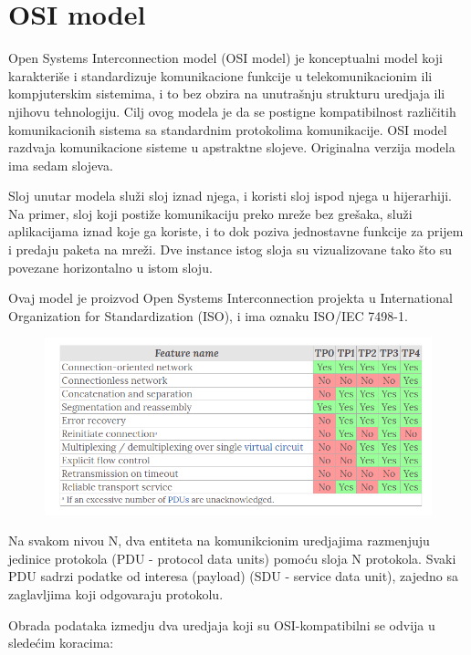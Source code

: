 \documentclass[a4paper,12pt, master]{etf}
\begin{document}
	\section{OSI model}

	Open Systems Interconnection model (OSI model) je konceptualni model koji
	karakteri\v{s}e i standardizuje komunikacione funkcije u telekomunikacionim
	ili kompjuterskim sistemima, i to bez obzira na unutra\v{s}nju strukturu
	uredjaja ili njihovu tehnologiju. Cilj ovog modela je da se postigne
	kompatibilnost razli\v{c}itih komunikacionih sistema sa standardnim
	protokolima komunikacije. OSI model razdvaja komunikacione sisteme u
	apstraktne slojeve.	Originalna verzija modela ima sedam slojeva.

	Sloj unutar modela slu\v{z}i sloj iznad njega, i koristi sloj ispod njega u
	hijerarhiji. Na	primer, sloj koji posti\v{z}e komunikaciju preko mre\v{z}e
	bez gre\v{s}aka, slu\v{z}i aplikacijama iznad koje ga koriste, i to dok
	poziva jednostavne funkcije za prijem i predaju paketa na mre\v{z}i.
	Dve instance istog sloja su vizualizovane tako \v{s}to su povezane
	horizontalno u istom sloju.

	Ovaj model je proizvod Open Systems Interconnection projekta u
	International Organization for Standardization (ISO), i ima oznaku ISO/IEC
	7498-1.

	\begin{figure}[htb]
			\centering
			\includegraphics[scale=.43]{../pic/tp_classes.png}
			\label{fig:tp_classes}
	\end{figure}

	Na svakom nivou N, dva entiteta na komunikcionim uredjajima razmenjuju
	jedinice protokola (PDU - protocol data units) pomo\'{c}u sloja N
	protokola. Svaki PDU sadrzi podatke od interesa	(payload) (SDU - service
	data unit), zajedno sa zaglavljima koji odgovaraju protokolu.

	Obrada podataka izmedju dva uredjaja koji su OSI-kompatibilni se odvija u
	slede\'{c}im koracima:
\end{document}
